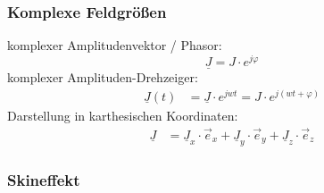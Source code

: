 \subsubsection{Komplexe Feldgrößen}
\textbullet komplexer Amplitudenvektor / Phasor:
\begin{equation*}
	\underline{J}=J\cdot e^{j\varphi}
\end{equation*}
\textbullet komplexer Amplituden-Drehzeiger:
\begin{align*}
\underline{J}(t)&=\underline{J} \cdot e ^{jwt} = J \cdot e^{j(wt+\varphi)}
\end{align*}
\textbullet Darstellung in karthesischen Koordinaten:
\begin{align*}
	\underline{J}&=\underline{J}_x \cdot \vec{e}_x + \underline{J}_y \cdot \vec{e}_y + \underline{J}_z \cdot \vec{e}_z
\end{align*}

\subsubsection{Skineffekt}




